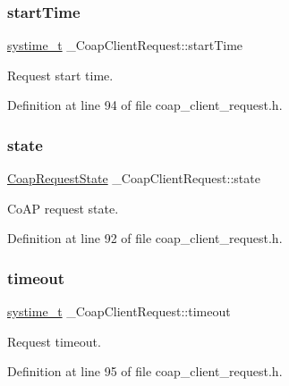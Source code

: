 \subsubsection{\texorpdfstring{start\+Time}{startTime}}
{\footnotesize\ttfamily \hyperlink{compiler__port_8h_ae3e32a98d431a02106616da3071832dd}{systime\+\_\+t} \+\_\+\+Coap\+Client\+Request\+::start\+Time}



Request start time. 



Definition at line 94 of file coap\+\_\+client\+\_\+request.\+h.

\mbox{\label{struct__CoapClientRequest_a9752aca06b0b4278196a77db2697eb56}} 
\subsubsection{\texorpdfstring{state}{state}}
{\footnotesize\ttfamily \hyperlink{coap__client__request_8h_ae23250f18b3b2a3d2dc7dc98cc664d04}{Coap\+Request\+State} \+\_\+\+Coap\+Client\+Request\+::state}



Co\+AP request state. 



Definition at line 92 of file coap\+\_\+client\+\_\+request.\+h.

\mbox{\label{struct__CoapClientRequest_a00fe6c1d2447ea2493087a18a44895a7}} 
\subsubsection{\texorpdfstring{timeout}{timeout}}
{\footnotesize\ttfamily \hyperlink{compiler__port_8h_ae3e32a98d431a02106616da3071832dd}{systime\+\_\+t} \+\_\+\+Coap\+Client\+Request\+::timeout}



Request timeout. 



Definition at line 95 of file coap\+\_\+client\+\_\+request.\+h.

